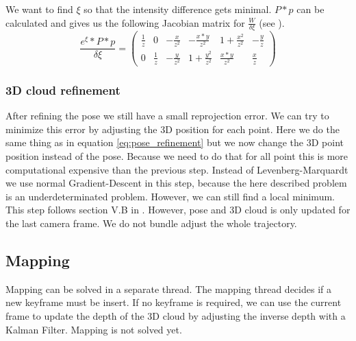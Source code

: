 \documentclass[11pt,a4paper,titlepage,oneside]{report}
\begin{document}
We want to find $\xi$ so that the intensity difference gets minimal. $P*p$ can be calculated and gives us the following Jacobian matrix for $\frac{W}{\delta \xi}$ (see \cite{se3_explain}).
\begin{equation}
	\frac{e^{\xi}*P*p}{\delta \xi}=\begin{pmatrix}
		\frac{1}{z} & 0 & -\frac{x}{z^2} & -\frac{x*y}{z^2} & 1 + \frac{x^2}{z^2} & -\frac{y}{z} \\
		0 & \frac{1}{z}  & -\frac{y}{z^2} & 1 + \frac{y^2}{z^2} & \frac{x*y}{z^2} &  \frac{x}{z}
	\end{pmatrix}
\end{equation}



\subsubsection{3D cloud refinement}
After refining the pose we still have a small reprojection error. We can try to minimize this error by adjusting the 3D position for each point. Here we do the same thing as in equation \ref{eq:pose_refinement} but we now change the 3D point position instead of the pose. Because we need to do that for all point this is more computational expensive than the previous step. Instead of Levenberg-Marquardt we use normal Gradient-Descent in this step, because the here described problem is an underdeterminated problem. However, we can still find a local minimum. This step follows section V.B in \cite{svo2}. However, pose and 3D cloud is only updated for the last camera frame. We do not bundle adjust the whole trajectory.

\subsection{Mapping}

Mapping can be solved in a separate thread. The mapping thread decides if a new keyframe must be insert. If no keyframe is required, we can use the current frame to update the depth of the 3D cloud by adjusting the inverse depth with a Kalman Filter. Mapping is not solved yet.
\end{document}
